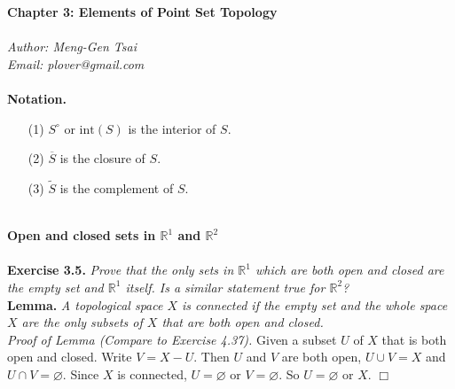 \documentclass{article}
\begin{document}
\textbf{\Large Chapter 3: Elements of Point Set Topology} \\\\



\emph{Author: Meng-Gen Tsai} \\
\emph{Email: plover@gmail.com} \\\\






\textbf{Notation.}
\begin{enumerate}
\item[(1)]
$S^{\circ}$ or $\text{int}(S)$ is the interior of $S$.
\item[(2)]
$\overline{S}$ is the closure of $S$.
\item[(3)]
$\widetilde{S}$ is the complement of $S$. \\\\
\end{enumerate}






\textbf{\large Open and closed sets in $\mathbb{R}^1$ and $\mathbb{R}^2$} \\\\



\textbf{Exercise 3.5.}
\emph{Prove that the only sets in $\mathbb{R}^1$ which are both open and closed
are the empty set and $\mathbb{R}^1$ itself.
Is a similar statement true for $\mathbb{R}^2$?} \\

\textbf{Lemma.}
\emph{A topological space $X$ is connected if the empty set
and the whole space $X$ are the only subsets of $X$ that are both open and
closed.} \\

\emph{Proof of Lemma (Compare to Exercise 4.37).}
Given a subset $U$ of $X$ that is both open and closed.
Write $V = X-U$.
Then $U$ and $V$ are both open, $U \cup V = X$ and $U \cap V = \varnothing$.
Since $X$ is connected, $U = \varnothing$ or $V = \varnothing$.
So $U = \varnothing$ or $X$.
$\Box$ \\
\end{document}
